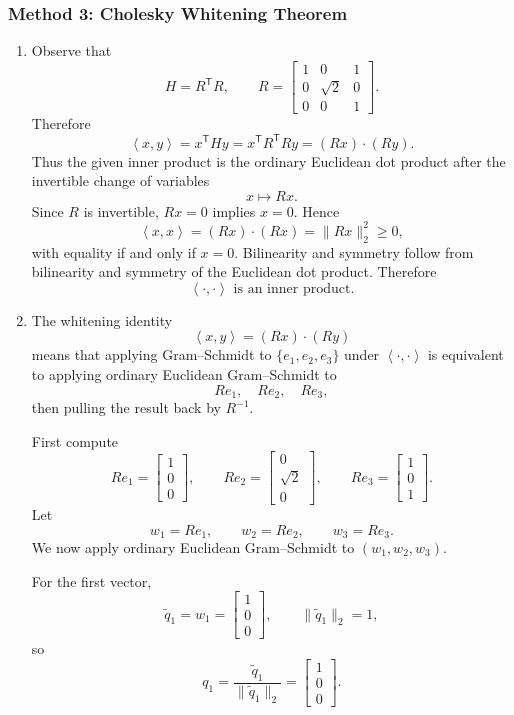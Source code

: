 \documentclass[12pt]{article}
\newcommand{\ip}[2]{\left\langle #1,#2\right\rangle}
\newcommand{\T}{\mathsf{T}}
\begin{document}
\newpage
\subsubsection{Method 3: Cholesky Whitening Theorem}
\begin{enumerate}[label=(\alph*)]
  \item Observe that
  \[
    H=R^\T R,
    \qquad
    R=
    \begin{bmatrix}
      1&0&1\\
      0&\sqrt2&0\\
      0&0&1
    \end{bmatrix}.
  \]
  Therefore
  \[
    \ip{x}{y}=x^\T H y=x^\T R^\T R y=(Rx)\cdot(Ry).
  \]
  Thus the given inner product is the ordinary Euclidean dot product after the
  invertible change of variables
  \[
    x\mapsto Rx.
  \]
  Since $R$ is invertible, $Rx=0$ implies $x=0$. Hence
  \[
    \ip{x}{x}=(Rx)\cdot(Rx)=\|Rx\|_2^2\ge0,
  \]
  with equality if and only if $x=0$. Bilinearity and symmetry follow from
  bilinearity and symmetry of the Euclidean dot product. Therefore
  \[
    \boxed{\ip{\cdot}{\cdot}\text{ is an inner product}.}
  \]

  \item The whitening identity
  \[
    \ip{x}{y}=(Rx)\cdot(Ry)
  \]
  means that applying Gram--Schmidt to $\{e_1,e_2,e_3\}$ under $\ip{\cdot}{\cdot}$
  is equivalent to applying ordinary Euclidean Gram--Schmidt to
  \[
    Re_1,\quad Re_2,\quad Re_3,
  \]
  then pulling the result back by $R^{-1}$.

  First compute
  \[
    Re_1=\begin{bmatrix}1\\0\\0\end{bmatrix},
    \qquad
    Re_2=\begin{bmatrix}0\\\sqrt2\\0\end{bmatrix},
    \qquad
    Re_3=\begin{bmatrix}1\\0\\1\end{bmatrix}.
  \]
  Let
  \[
    w_1=Re_1,\qquad w_2=Re_2,\qquad w_3=Re_3.
  \]
  We now apply ordinary Euclidean Gram--Schmidt to $(w_1,w_2,w_3)$.

  For the first vector,
  \[
    \widetilde q_1=w_1=\begin{bmatrix}1\\0\\0\end{bmatrix},
    \qquad
    \|\widetilde q_1\|_2=1,
  \]
  so
  \[
    q_1=\frac{\widetilde q_1}{\|\widetilde q_1\|_2}
    =
    \begin{bmatrix}1\\0\\0\end{bmatrix}.
  \]


\end{enumerate}
\end{document}
